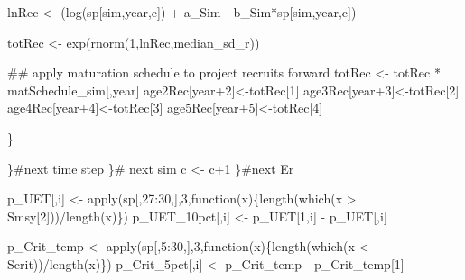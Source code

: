 \documentclass[
  11pt,
]{article}
\newenvironment{Shaded}{}{}
\newcommand{\CommentTok}[1]{\textcolor[rgb]{0.00,0.50,0.00}{#1}}
\newcommand{\ControlFlowTok}[1]{\textcolor[rgb]{0.00,0.00,1.00}{#1}}
\newcommand{\DecValTok}[1]{#1}
\newcommand{\KeywordTok}[1]{\textcolor[rgb]{0.00,0.00,1.00}{#1}}
\newcommand{\NormalTok}[1]{#1}
\newcommand{\OperatorTok}[1]{#1}
\newcommand{\StringTok}[1]{\textcolor[rgb]{0.00,0.50,0.50}{#1}}
\begin{document}
\begin{Shaded}
\begin{Highlighting}[]
{\NormalTok{            lnRec <-}\StringTok{ }\NormalTok{(}\KeywordTok{log}\NormalTok{(sp[sim,year,c]) }\OperatorTok{+}\StringTok{ }\NormalTok{a_Sim }\OperatorTok{-}\StringTok{ }\NormalTok{b_Sim}\OperatorTok{*}\NormalTok{sp[sim,year,c])}
            
\NormalTok{            totRec <-}\StringTok{ }\KeywordTok{exp}\NormalTok{(}\KeywordTok{rnorm}\NormalTok{(}\DecValTok{1}\NormalTok{,lnRec,median_sd_r))}
            
            \CommentTok{## apply maturation schedule to project recruits forward}
\NormalTok{            totRec <-}\StringTok{ }\NormalTok{totRec }\OperatorTok{*}\StringTok{ }\NormalTok{matSchedule_sim[,year]}
\NormalTok{            age2Rec[year}\OperatorTok{+}\DecValTok{2}\NormalTok{]<-totRec[}\DecValTok{1}\NormalTok{]}
\NormalTok{            age3Rec[year}\OperatorTok{+}\DecValTok{3}\NormalTok{]<-totRec[}\DecValTok{2}\NormalTok{]}
\NormalTok{            age4Rec[year}\OperatorTok{+}\DecValTok{4}\NormalTok{]<-totRec[}\DecValTok{3}\NormalTok{]}
\NormalTok{            age5Rec[year}\OperatorTok{+}\DecValTok{5}\NormalTok{]<-totRec[}\DecValTok{4}\NormalTok{]}
            
\NormalTok{          \}}
          
\NormalTok{        \}}\CommentTok{#next time step}
\NormalTok{      \}}\CommentTok{# next sim}
\NormalTok{      c <-}\StringTok{ }\NormalTok{c}\OperatorTok{+}\DecValTok{1}
\NormalTok{    \}}\CommentTok{#next Er}
    
\NormalTok{    p_UET[,i] <-}\StringTok{ }\KeywordTok{apply}\NormalTok{(sp[,}\DecValTok{27}\OperatorTok{:}\DecValTok{30}\NormalTok{,],}\DecValTok{3}\NormalTok{,}\ControlFlowTok{function}\NormalTok{(x)\{}\KeywordTok{length}\NormalTok{(}\KeywordTok{which}\NormalTok{(x }\OperatorTok{>}\StringTok{ }\NormalTok{Smsy[}\DecValTok{2}\NormalTok{]))}\OperatorTok{/}\KeywordTok{length}\NormalTok{(x)\})}
\NormalTok{    p_UET_10pct[,i] <-}\StringTok{ }\NormalTok{p_UET[}\DecValTok{1}\NormalTok{,i] }\OperatorTok{-}\StringTok{ }\NormalTok{p_UET[,i]}
  
\NormalTok{    p_Crit_temp <-}\StringTok{ }\KeywordTok{apply}\NormalTok{(sp[,}\DecValTok{5}\OperatorTok{:}\DecValTok{30}\NormalTok{,],}\DecValTok{3}\NormalTok{,}\ControlFlowTok{function}\NormalTok{(x)\{}\KeywordTok{length}\NormalTok{(}\KeywordTok{which}\NormalTok{(x }\OperatorTok{<}\StringTok{ }\NormalTok{Scrit))}\OperatorTok{/}\KeywordTok{length}\NormalTok{(x)\})}
\NormalTok{    p_Crit_5pct[,i] <-}\StringTok{ }\NormalTok{p_Crit_temp }\OperatorTok{-}\StringTok{ }\NormalTok{p_Crit_temp[}\DecValTok{1}\NormalTok{]}
    
}
\end{Highlighting}
\end{Shaded}
\end{document}

